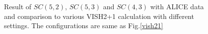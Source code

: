 \begin{figure}[h]
\begin{center}
        \caption{Result of  $SC(5,2)$, $SC(5,3)$ and $SC(4,3)$ with ALICE data and comparison to various VISH2+1 calculation with different settings. The configurations are same as Fig.\ref{vish21}}
        \label{vishcomhigh}
        \end{center}   
     \end{figure}

